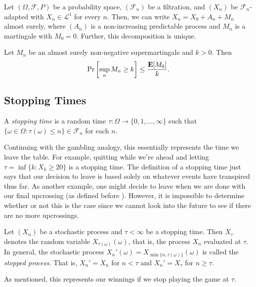 		\begin{lemma}
			Let $(\Omega,\mathcal{F},P)$ be a probability space, $(\mathcal{F}_n)$ be a filtration, and $(X_n)$ be $\mathcal{F}_n$-adapted with $X_n\in\mathcal{L}^1$ for every $n$. Then, we can write $X_n = X_0 + A_n + M_n$ almost surely, where $(A_n)$ is a non-increasing predictable process and $M_n$ is a martingale with $M_0=0$. Further, this decomposition is unique.
		\end{lemma}

		\begin{lemma}
			Let $M_n$ be an almost surely non-negative supermartingale and $k>0$. Then
			\[ \Pr\left[\sup_n M_n \geq k\right] \leq \frac{\textbf{E}[M_0]}{k}. \]
		\end{lemma}

		\subsection{Stopping Times}

		\begin{definition}
			A \textit{stopping time} is a random time $\tau:\Omega\to\{0,1,\ldots,\infty\}$ such that $\{\omega\in\Omega : \tau(\omega)\leq n\}\in\mathcal{F}_n$ for each $n$.
		\end{definition}

		Continuing with the gambling analogy, this essentially represents the time we leave the table. For example, quitting while we're ahead and letting $\tau=\inf\{k : X_k \geq 20\}$ is a stopping time. The definition of a stopping time just says that our decision to leave is based solely on whatever events have transpired thus far. As another example, one might decide to leave when we are done with our final upcrossing (as defined before ). However, it is impossible to determine whether or not this is the case since we cannot look into the future to see if there are no more upcrossings.

		\begin{definition}
			Let $(X_n)$ be a stochastic process and $\tau<\infty$ be a stopping time. Then $X_\tau$ denotes the random variable $X_{\tau(\omega)}(\omega)$, that is, the process $X_n$ evaluated at $\tau$. In general, the stochastic process $X_n'(\omega) = X_{\min\{n,\tau(\omega)\}}(\omega)$ is called the \textit{stopped process}. That is, $X_n'=X_n$ for $n<\tau$ and $X_n' = X_\tau$ for $n\geq\tau$.
		\end{definition}

		As mentioned, this represents our winnings if we stop playing the game at $\tau$.

